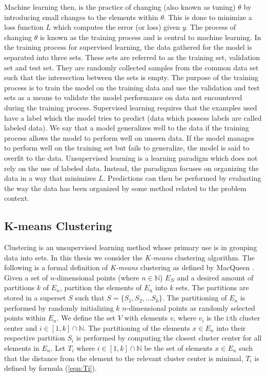 Machine learning then, is the practice of changing (also known as tuning) $\theta$ by introducing small changes to the elements within $\theta$. This is done to minimize a loss function $L$ which computes the error (or loss) given $y$. The process of changing $\theta$ is known as the training process and is central to machine learning. In the training process for supervised learning, the data gathered for the model is separated into three sets. These sets are referred to as the training set, validation set and test set. They are randomly collected samples from the common data set such that the intersection between the sets is empty. The purpose of the training process is to train the model on the training data and use the validation and test sets as a means to validate the model performance on data not encountered during the training process. Supervised learning requires that the examples used have a label which the model tries to predict (data which possess labels are called labeled data). We say that a model generalizes well to the data if the training process allows the model to perform well on unseen data. If the model manages to perform well on the training set but fails to generalize, the model is said to overfit to the data. Unsupervised learning is a learning paradigm which does not rely on the use of labeled data. Instead, the paradigmn focuses on organizing the data in a way that minimizes $L$. Predictions can then be performed by evaluating the way the data has been organized by some method related to the problem context.


\subsection{K-means Clustering}

Clustering is an unsupervised learning method whose primary use is in grouping data into sets. In this thesis we consider the \textit{K-means} clustering algorithm. The following is a formal definition of \textit{K-means} clustering as defined by MacQueen \cite{macqueen}. Given a set of $n$-dimensional points (where $n \in \mathbb{N}$) $E_N$ and a desired amount of partitions $k$ of $E_n$, partition the elements of $E_n$ into $k$ sets. The partitions are stored in a superset $S$ such that $S = \{S_1, S_2, ... S_k\}$. The partitioning of $E_n$ is performed by randomly initializing $k$ $n$-dimensional points as randomly selected points within $E_n$. We define the set $V$ with elements $v$, where $v_i$ is the i:th cluster center and $i \in [1, k] \cap \mathbb{N}$. The partitioning of the elements $x \in E_n$ into their respective partition $S_i$ is performed by computing the closest cluster center for all elements in $E_n$. Let $T_i$ where $i \in [1, k] \cap \mathbb{N}$ be the set of elements $x \in E_n$ such that the distance from the element to the relevant cluster center is minimal, $T_i$ is defined by formula (\ref{eqn:Ti}).

